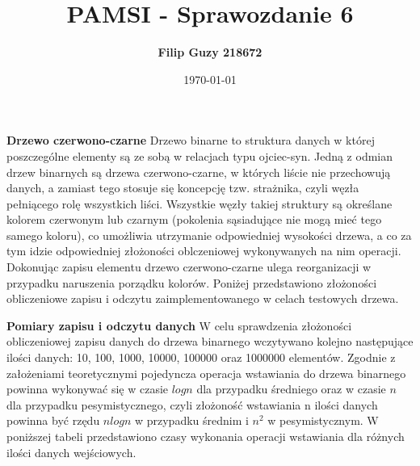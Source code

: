 \documentclass[10pt, a4paper]{article}
\date{\today}
\title{\textbf{PAMSI - Sprawozdanie 6}}
\author{\textbf{Filip Guzy 218672}}
\begin{document}
\maketitle

\begin{flushleft}
\textbf{Drzewo czerwono-czarne} \newline \newline
Drzewo binarne to struktura danych w której poszczególne elementy są ze sobą w relacjach typu ojciec-syn. Jedną z odmian drzew binarnych są drzewa czerwono-czarne, w których liście nie przechowują danych, a zamiast tego stosuje się koncepcję tzw. strażnika, czyli węzła pełniącego rolę wszystkich liści. Wszystkie węzły takiej struktury są określane kolorem czerwonym lub czarnym (pokolenia sąsiadujące nie mogą mieć tego samego koloru), co umożliwia utrzymanie odpowiedniej wysokości drzewa, a co za tym idzie odpowiedniej złożoności oblczeniowej wykonywanych na nim operacji. Dokonując zapisu elementu drzewo czerwono-czarne ulega reorganizacji w przypadku naruszenia porządku kolorów. Poniżej przedstawiono złożoności obliczeniowe zapisu i odczytu zaimplementowanego w celach testowych drzewa. \newline

\textbf{Pomiary zapisu i odczytu danych} \newline \newline
W celu sprawdzenia złożoności obliczeniowej zapisu danych do drzewa binarnego wczytywano kolejno następujące ilości danych: 10, 100, 1000, 10000, 100000 oraz 1000000 elementów. Zgodnie z założeniami teoretycznymi pojedyncza operacja wstawiania do drzewa binarnego powinna wykonywać się w czasie $logn$ dla przypadku średniego oraz w czasie $n$ dla przypadku pesymistycznego, czyli złożoność wstawiania n ilości danych powinna być rzędu $nlogn$ w przypadku średnim i $n^2$ w pesymistycznym. W poniższej tabeli przedstawiono czasy wykonania operacji wstawiania dla różnych ilości danych wejściowych.


\end{flushleft}
\end{document}

